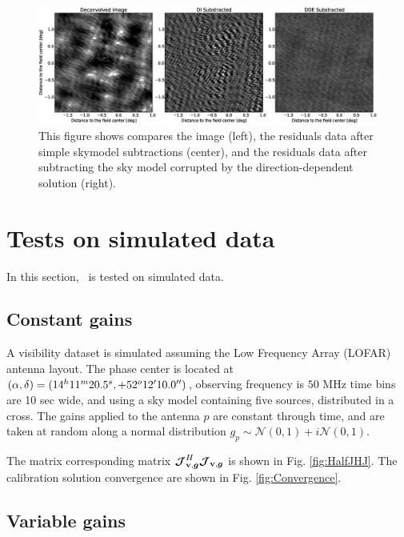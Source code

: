 
\begin{figure}
\begin{center}
\includegraphics[width=\textwidth]{residSimZoom2.eps}
\caption{\label{fig:resid} This figure shows compares the image
  (left), the residuals data after simple skymodel subtractions
  (center), and the residuals data after subtracting the
  sky model corrupted by the direction-dependent solution (right).}
\end{center}
\end{figure}


\section{Tests on simulated data}

In this section, \COH~is tested on simulated data.

\subsection{Constant gains}
\label{sec:SimpleSimul}

A visibility dataset is simulated assuming the Low Frequency Array (LOFAR) antenna
layout. The phase center is located at
$(\alpha,\delta)=(14^h11^m20.5^s, +52^{o}12\hbox{$^\prime$}10.0\hbox{$^{\prime\prime}$})$,
observing frequency is $50$ MHz time
bins are 10 sec wide, and using a sky model containing five
sources, distributed in a cross. The gains applied to the antenna $p$ are
constant through time, and are taken at random along a normal distribution
$g_{p}\sim\mathcal{N}\left(0,1\right)+i\mathcal{N}\left(0,1\right)$.

The matrix corresponding matrix $\bm{\mathcal{J}}_{\textbf{v},\bm{g}}^H\bm{\mathcal{J}}_{\textbf{v},\bm{g}}$ is shown in
Fig. \ref{fig:HalfJHJ}. The calibration solution convergence are shown
in Fig. \ref{fig:Convergence}.



\subsection{Variable gains}
\label{sec:VarSimul}

